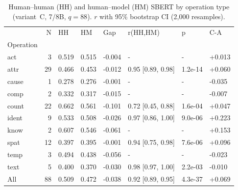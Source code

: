\begin{table}[t]
\centering
\caption{Human--human (HH) and human--model (HM) SBERT by operation type (variant~C, 7/8B, $q=88$). $r$ with 95\% bootstrap CI (2{,}000 resamples).}
\label{tab:hh_hm_op}
\small
\begin{tabular}{lrllllll}
\toprule
 & N & HH & HM & Gap & r(HH,HM) & p & C-A \\
Operation &  &  &  &  &  &  &  \\
\midrule
act & 3 & 0.519 & 0.515 & -0.004 & - & - & +0.013 \\
attr & 29 & 0.466 & 0.453 & -0.012 & 0.95 [0.89, 0.98] & 1.2e-14 & +0.060 \\
cause & 1 & 0.278 & 0.276 & -0.001 & - & - & -0.035 \\
comp & 2 & 0.332 & 0.317 & -0.015 & - & - & -0.007 \\
count & 22 & 0.662 & 0.561 & -0.101 & 0.72 [0.45, 0.88] & 1.6e-04 & +0.047 \\
ident & 9 & 0.533 & 0.508 & -0.026 & 0.97 [0.86, 1.00] & 9.0e-06 & +0.223 \\
know & 2 & 0.607 & 0.546 & -0.061 & - & - & +0.153 \\
spat & 12 & 0.397 & 0.395 & -0.001 & 0.94 [0.75, 0.98] & 7.6e-06 & +0.096 \\
temp & 3 & 0.494 & 0.438 & -0.056 & - & - & -0.023 \\
text & 5 & 0.400 & 0.370 & -0.030 & 0.98 [0.97, 1.00] & 2.2e-03 & -0.010 \\
All & 88 & 0.509 & 0.472 & -0.038 & 0.92 [0.89, 0.95] & 4.3e-37 & +0.069 \\
\bottomrule
\end{tabular}
\end{table}
